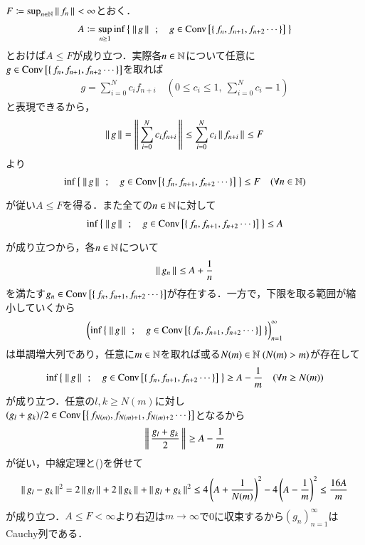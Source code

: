 
\begin{prf}
	$F \coloneqq \operatorname*{sup}_{n \in \mathbb{N}} \left\|\, f_n\, \right\|_{} < \infty$とおく．
	\begin{align}
		A \coloneqq \operatorname*{sup}_{n \geq 1} \operatorname*{inf}_{} \left\{\ \left\|\, g\, \right\|_{}\ \, ; \quad g \in \mathrm{Conv}\left[\left\{\, f_n,f_{n+1},f_{n+2} \cdots \, \right\}\right]\ \right\}
	\end{align}
	とおけば$A \leq F$が成り立つ．実際各$n \in \mathbb{N}$について任意に$g \in \mathrm{Conv}\left[\left\{\, f_n,f_{n+1},f_{n+2} \cdots \, \right\}\right]$を取れば
	\begin{align}
		g = \sum_{i=0}^{N}c_i f_{n+i} \quad \left( 0 \leq c_i \leq 1,\ \mbox{$\sum_{i=0}^{N} c_i = 1$} \right)
	\end{align}
	と表現できるから，
	\begin{align}
		\left\|\, g\, \right\|_{} = \left\|\, \sum_{i=0}^{N}c_i f_{n+i}\, \right\|_{} \leq \sum_{i=0}^{N}c_i \left\|\, f_{n+i}\, \right\|_{} \leq F
	\end{align}
	より
	\begin{align}
		\operatorname*{inf}_{} \left\{\ \left\|\, g\, \right\|_{}\ \, ; \quad g \in \mathrm{Conv}\left[\left\{\, f_n,f_{n+1},f_{n+2} \cdots \, \right\}\right]\ \right\} \leq F \quad (\forall n \in \mathbb{N})
	\end{align}
	が従い$A \leq F$を得る．また全ての$n \in \mathbb{N}$に対して
	\begin{align}
		\operatorname*{inf}_{} \left\{\ \left\|\, g\, \right\|_{}\ \, ; \quad g \in \mathrm{Conv}\left[\left\{\, f_n,f_{n+1},f_{n+2} \cdots \, \right\}\right]\ \right\} \leq A
	\end{align}
	が成り立つから，各$n \in \mathbb{N}$について
	\begin{align}
		\left\|\, g_n\, \right\|_{} \leq A + \frac{1}{n} \label{eq:thm_kolmos_1}
	\end{align}
	を満たす$g_n \in \mathrm{Conv}\left[\left\{\, f_n,f_{n+1},f_{n+2} \cdots \, \right\}\right]$が存在する．一方で，下限を取る範囲が縮小していくから
	\begin{align}
		\left( \operatorname*{inf}_{} \left\{\ \left\|\, g\, \right\|_{}\ \, ; \quad g \in \mathrm{Conv}\left[\left\{\, f_n,f_{n+1},f_{n+2} \cdots \, \right\}\right]\ \right\} \right)_{n=1}^\infty
	\end{align}
	は単調増大列であり，任意に$m \in \mathbb{N}$を取れば或る$N(m) \in \mathbb{N}\ (N(m) > m)$が存在して
	\begin{align}
		\operatorname*{inf}_{} \left\{\ \left\|\, g\, \right\|_{}\ \, ; \quad g \in \mathrm{Conv}\left[\left\{\, f_n,f_{n+1},f_{n+2} \cdots \, \right\}\right]\ \right\} \geq A - \frac{1}{m}
		\quad (\forall n \geq N(m))
	\end{align}
	が成り立つ．任意の$l,k \geq N(m)$に対し$(g_l + g_k) / 2 \in \mathrm{Conv}\left[\left\{\, f_{N(m)},f_{N(m)+1},f_{N(m)+2} \cdots \, \right\}\right]$となるから
	\begin{align}
		\left\|\, \frac{g_l + g_k}{2}\, \right\|_{} \geq A - \frac{1}{m}
	\end{align}
	が従い，中線定理と()を併せて
	\begin{align}
		\left\|\, g_l - g_k\, \right\|_{}^2 = 2\left\|\, g_l\, \right\|_{} + 2\left\|\, g_k\, \right\|_{} + \left\|\, g_l + g_k\, \right\|_{}^2 \leq 4\left( A + \frac{1}{N(m)} \right)^2 - 4\left( A - \frac{1}{m} \right)^2 \leq \frac{16A}{m}
	\end{align}
	が成り立つ．$A \leq F < \infty$より右辺は$m \longrightarrow \infty$で0に収束するから$(g_n)_{n=1}^{\infty}$はCauchy列である．
	\QED
\end{prf}